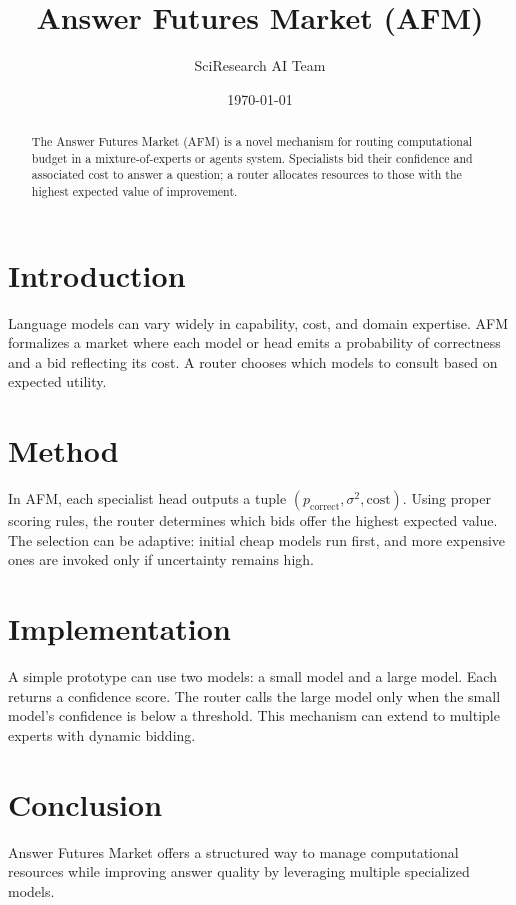 \documentclass{article}
\title{Answer Futures Market (AFM)}
\author{SciResearch AI Team}
\date{\today}
\begin{document}
\maketitle
\begin{abstract}
The Answer Futures Market (AFM) is a novel mechanism for routing computational budget in a mixture-of-experts or agents system. Specialists bid their confidence and associated cost to answer a question; a router allocates resources to those with the highest expected value of improvement.
\end{abstract}
\section{Introduction}
Language models can vary widely in capability, cost, and domain expertise. AFM formalizes a market where each model or head emits a probability of correctness and a bid reflecting its cost. A router chooses which models to consult based on expected utility.
\section{Method}
In AFM, each specialist head outputs a tuple $(p_{\text{correct}}, \sigma^2, \text{cost})$. Using proper scoring rules, the router determines which bids offer the highest expected value. The selection can be adaptive: initial cheap models run first, and more expensive ones are invoked only if uncertainty remains high.
\section{Implementation}
A simple prototype can use two models: a small model and a large model. Each returns a confidence score. The router calls the large model only when the small model's confidence is below a threshold. This mechanism can extend to multiple experts with dynamic bidding.
\section{Conclusion}
Answer Futures Market offers a structured way to manage computational resources while improving answer quality by leveraging multiple specialized models.
\end{document}
